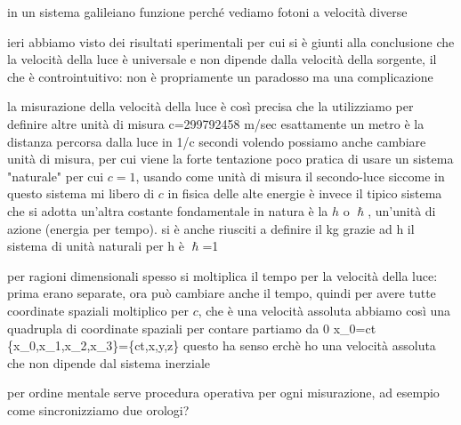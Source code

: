 in un sistema galileiano funzione perché vediamo fotoni a velocità diverse




ieri abbiamo visto dei risultati sperimentali per cui si è giunti alla conclusione che la velocità della luce è universale e non dipende dalla velocità della sorgente, il che è controintuitivo: non è propriamente un paradosso ma una complicazione

la misurazione della velocità della luce è così precisa che la utilizziamo per definire altre unità di misura
	c=299792458 m/sec esattamente
un metro è la distanza percorsa dalla luce in 1/c secondi
volendo possiamo anche cambiare unità di misura, per cui viene la forte tentazione poco pratica di usare un sistema "naturale" per cui $c=1$, usando come unità di misura il secondo-luce
siccome in questo sistema mi libero di $c$
in fisica delle alte energie è invece il tipico sistema che si adotta
un'altra costante fondamentale in natura è la $h$ o $\hslash$, un'unità di azione (energia per tempo). si è anche riusciti a definire il kg grazie ad h
il sistema di unità naturali per h è $\hslash$=1

per ragioni dimensionali spesso si moltiplica il tempo per la velocità della luce: prima erano separate, ora può cambiare anche il tempo, quindi per avere tutte coordinate spaziali moltiplico per $c$, che è una velocità assoluta
abbiamo così una quadrupla di coordinate spaziali
per contare partiamo da 0
	x_0=ct
	\{x_0,x_1,x_2,x_3\}=\{ct,x,y,z\}
questo ha senso erchè ho una velocità assoluta che non dipende dal sistema inerziale

per ordine mentale serve procedura operativa per ogni misurazione, ad esempio come sincronizziamo due orologi?


